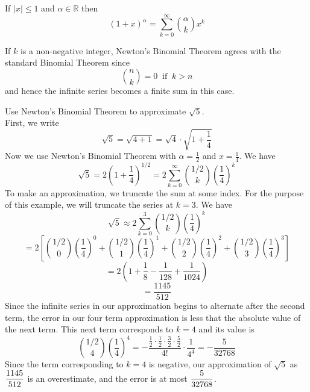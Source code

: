 \documentclass[handout]{ximera}
\begin{document}
\begin{theorem}
If $|x| \leq 1$ and $\alpha \in \mathbb{R}$ then
\[
(1+x)^\alpha = \sum_{k = 0}^\infty \binom{\alpha}{k}x^k
\]
\end{theorem}

\begin{remark} If $k$ is a non-negative integer, Newton's Binomial Theorem agrees with the standard Binomial Theorem since 
\[
\binom{n}{k} = 0 \;\; \text{if} \;\; k > n
\]
and hence the infinite series becomes a finite sum in this case.
\end{remark}


\begin{example}
Use Newton's Binomial Theorem to approximate $\sqrt 5$.\\
First, we write 
\[
\sqrt 5 = \sqrt{4+1} = \sqrt{4}\cdot \sqrt{1+\frac{1}{4}}
\]
Now we use Newton's Binomial Theorem with $\alpha = \frac12$ and $x = \frac14$.
We have
\[
\sqrt 5 = 2\left(1+\frac14\right)^{1/2} = 2\sum_{k=0}^\infty \binom{1/2}{k} \left(\frac14\right)^k
\]
To make an approximation, we truncate the sum at some index.  For the purpose of this example, we will truncate the series at $k = 3$. We have
\[
\sqrt 5 \approx 2\sum_{k=0}^3 \binom{1/2}{k} \left(\frac14\right)^k 
\]
\[
= 2\left[\binom{1/2}{0} \left(\frac14\right)^0 +\binom{1/2}{1} \left(\frac14\right)^1 + \binom{1/2}{2} \left(\frac14\right)^2 + \binom{1/2}{3} \left(\frac14\right)^3 \right]
\]
\[
= 2\left(1 + \frac18 - \frac{1}{128} + \frac{1}{1024}\right)
\]
\[
= \frac{1145}{512}
\]
Since the infinite series in our approximation begins to alternate after the second term, 
the error in our four term approximation is less that the absolute value of the next term. 
This next term corresponds to $k= 4$ and its value is 
\[
\binom{1/2}{4}\left(\frac14\right)^4 = -\frac{\frac12\cdot \frac12\cdot \frac32 \cdot\frac52}{4!}\cdot \frac{1}{4^4}
 = -\frac{5}{32768}
\]
Since the term corresponding to $k = 4$ is negative, our approximation of $\sqrt 5$ 
as $\displaystyle \frac{1145}{512}$ is an overestimate, and the error is at most $\displaystyle \frac{5}{32768}$.
\end{example}
\end{document}
